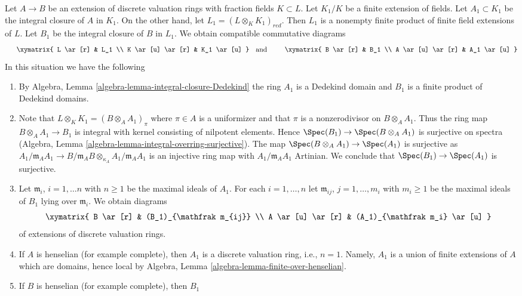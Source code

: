 \begin{remark}
\label{remark-construction}
Let $A \to B$ be an extension of discrete valuation rings with fraction
fields $K \subset L$. Let $K_1/K$ be a finite extension of
fields. Let $A_1 \subset K_1$ be the integral closure of $A$ in $K_1$.
On the other hand, let $L_1 = (L \otimes_K K_1)_{red}$. Then $L_1$ is a
nonempty finite product of finite field extensions of $L$. Let $B_1$ be
the integral closure of $B$ in $L_1$. We obtain compatible commutative
diagrams
$$
\vcenter{
\xymatrix{
L \ar[r] & L_1 \\
K \ar[u] \ar[r] & K_1 \ar[u]
}
}
\quad\text{and}\quad
\vcenter{
\xymatrix{
B \ar[r] & B_1 \\
A \ar[u] \ar[r] & A_1 \ar[u]
}
}
$$
In this situation we have the following
\begin{enumerate}
\item By Algebra, Lemma \ref{algebra-lemma-integral-closure-Dedekind}
the ring $A_1$ is a Dedekind domain and $B_1$ is a finite product of
Dedekind domains.
\item Note that $L \otimes_K K_1 = (B \otimes_A A_1)_\pi$ where $\pi \in A$
is a uniformizer and that $\pi$ is a nonzerodivisor on $B \otimes_A A_1$. 
Thus the ring map $B \otimes_A A_1 \to B_1$ is integral with kernel
consisting of nilpotent elements. Hence $\Spec(B_1) \to \Spec(B \otimes_A A_1)$
is surjective on spectra
(Algebra, Lemma \ref{algebra-lemma-integral-overring-surjective}).
The map $\Spec(B \otimes_A A_1) \to \Spec(A_1)$ is surjective as
$A_1/\mathfrak m_A A_1 \to
B/\mathfrak m_AB \otimes_{\kappa_A} A_1/\mathfrak m_A A_1$
is an injective ring map with $A_1/\mathfrak m_A A_1$ Artinian.
We conclude that $\Spec(B_1) \to \Spec(A_1)$ is surjective.
\item Let $\mathfrak m_i$, $i = 1, \ldots n$ with $n \geq 1$ be the
maximal ideals of $A_1$. For each $i = 1, \ldots, n$ let
$\mathfrak m_{ij}$, $j = 1, \ldots, m_i$ with $m_i \geq 1$
be the maximal ideals of $B_1$ lying over $\mathfrak m_i$. We obtain diagrams
$$
\xymatrix{
B \ar[r] & (B_1)_{\mathfrak m_{ij}} \\
A \ar[u] \ar[r] & (A_1)_{\mathfrak m_i} \ar[u]
}
$$
of extensions of discrete valuation rings.
\item If $A$ is henselian (for example complete), then $A_1$ is a
discrete valuation ring, i.e., $n = 1$.
Namely, $A_1$ is a union of finite extensions of $A$ which are domains,
hence local by Algebra, Lemma \ref{algebra-lemma-finite-over-henselian}.
\item If $B$ is henselian (for example complete), then $B_1$

\end{enumerate}
\end{remark}
